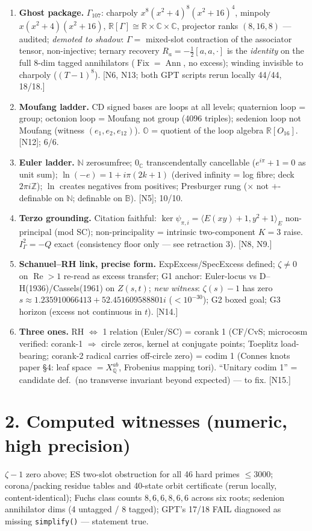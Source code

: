 \documentclass[10pt]{article}
\newcommand{\B}{\mathbb B}\newcommand{\N}{\mathbb N}\newcommand{\Z}{\mathbb Z}
\newcommand{\Q}{\mathbb Q}\newcommand{\R}{\mathbb R}\newcommand{\C}{\mathbb C}
\newcommand{\Ooct}{\mathbb O}
\begin{document}
\begin{enumerate}[leftmargin=1.6em,itemsep=1pt]
\item \textbf{Ghost package.} $\Gamma_{107}$: charpoly $x^8(x^2{+}4)^8(x^2{+}16)^4$, minpoly $x(x^2{+}4)(x^2{+}16)$, $\R[\Gamma]\cong\R\times\C\times\C$, projector ranks $(8,16,8)$ --- audited; \emph{demoted to shadow}: $\Gamma=$ mixed-slot contraction of the associator tensor, non-injective; ternary recovery $R_a=-\frac12[a,a,\cdot]$ is the \emph{identity} on the full 8-dim tagged annihilators ($\operatorname{Fix}=\operatorname{Ann}$, no excess); winding invisible to charpoly ($(T-1)^8$). [N6, N13; both GPT scripts rerun locally 44/44, 18/18.]
\item \textbf{Moufang ladder.} CD signed bases are loops at all levels; quaternion loop = group; octonion loop = Moufang not group (4096 triples); sedenion loop not Moufang (witness $(e_1,e_2,e_{12})$). $\Ooct$ = quotient of the loop algebra $\R[O_{16}]$. [N12]; 6/6.
\item \textbf{Euler ladder.} $\N$ zerosumfree; $0_\C$ transcendentally cancellable ($e^{i\pi}+1=0$ as unit sum); $\ln(-e)=1+i\pi(2k+1)$ (derived infinity = log fibre; deck $2\pi i\Z$); $\ln$ creates negatives from positives; Presburger rung ($\times$ not $+$-definable on $\N$; definable on $\B$). [N5]; 10/10.
\item \textbf{Terzo grounding.} Citation faithful: $\ker\psi_{\pi,i}=\langle E(xy)+1,y^2+1\rangle_E$ non-principal (mod SC); non-principality = intrinsic two-component $K{=}3$ raise. $I_\Gamma^2=-Q$ exact (consistency floor only --- see retraction 3). [N8, N9.]
\item \textbf{Schanuel--RH link, precise form.} ExpExcess/SpecExcess defined; $\zeta\neq0$ on $\operatorname{Re}>1$ re-read as excess transfer; G1 anchor: Euler-locus vs D--H(1936)/Cassels(1961) on $Z(s,t)$; \emph{new witness}: $\zeta(s)-1$ has zero $s\approx1.235910066413+52.451609588801i$ ($<10^{-30}$); G2 boxed goal; G3 horizon (excess not continuous in $t$). [N14.]
\item \textbf{Three ones.} RH $\iff$ 1 relation (Euler/SC) = corank 1 (CF/CvS; microcosm verified: corank-1 $\Rightarrow$ circle zeros, kernel at conjugate points; Toeplitz load-bearing; corank-2 radical carries off-circle zero) = codim 1 (Connes knots paper \S4: leaf space $=X^{ab}_\Q$, Frobenius mapping tori). ``Unitary codim 1'' = candidate def.\ (no transverse invariant beyond expected) --- to fix. [N15.]
\end{enumerate}

\section*{2. Computed witnesses (numeric, high precision)}
$\zeta-1$ zero above; ES two-slot obstruction for all 46 hard primes $\le3000$; corona/packing residue tables and 40-state orbit certificate (rerun locally, content-identical); Fuchs class counts $8,6,6,8,6,6$ across six roots; sedenion annihilator dims (4 untagged / 8 tagged); GPT's 17/18 FAIL diagnosed as missing \texttt{simplify()} --- statement true.
\end{document}
